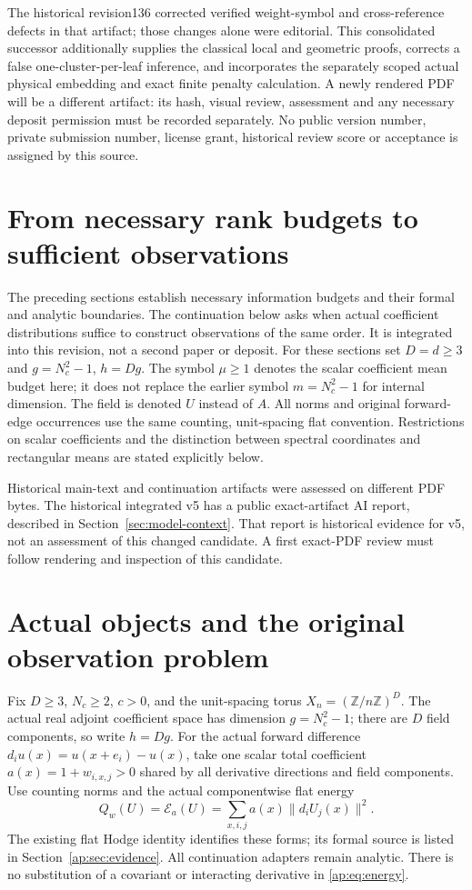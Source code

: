 \documentclass[11pt]{article}
\newcommand{\E}{\mathcal E}
\begin{document}
The historical revision136 corrected verified weight-symbol and cross-reference
defects in that artifact; those changes alone were editorial. This consolidated
successor additionally supplies the classical local and geometric proofs,
corrects a false one-cluster-per-leaf inference, and incorporates the separately
scoped actual physical embedding and exact finite penalty calculation. A newly rendered PDF will be a different
artifact: its hash, visual review, assessment and any necessary deposit permission
must be recorded separately. No public version number, private submission number,
license grant, historical review score or acceptance is assigned by this source.

\section{From necessary rank budgets to sufficient observations}
The preceding sections establish necessary information budgets and their
formal and analytic boundaries. The continuation below asks when actual
coefficient distributions suffice to construct observations of the same
order. It is integrated into this revision, not a second paper or deposit.
For these sections set $D=d\geq3$ and $g=N_c^2-1$, $h=Dg$.
The symbol $\mu\geq1$ denotes the scalar coefficient mean budget here;
it does not replace the earlier symbol $m=N_c^2-1$ for internal dimension.
The field is denoted $U$ instead of $A$. All norms and original forward-edge
occurrences use the same counting, unit-spacing flat convention. Restrictions
on scalar coefficients and the distinction between spectral coordinates and
rectangular means are stated explicitly below.

Historical main-text and continuation artifacts were assessed on different
PDF bytes. The historical integrated v5 has a public exact-artifact
AI report, described in Section~\ref{sec:model-context}. That report is historical
evidence for v5, not an assessment of this changed candidate. A first exact-PDF
review must follow rendering and inspection of this candidate.
\section{Actual objects and the original observation problem}\label{ap:sec:objects}
Fix $D\geq3$, $N_c\geq2$, $c>0$, and the unit-spacing torus
$X_n=(\mathbb Z/n\mathbb Z)^D$. The actual real adjoint coefficient space has dimension
$g=N_c^2-1$; there are $D$ field components, so write $h=Dg$.
For the actual forward difference $d_i u(x)=u(x+e_i)-u(x)$, take one scalar total
coefficient $a(x)=1+w_{i,x,j}>0$ shared by all derivative directions and field components.
Use counting norms and the actual componentwise flat energy
\begin{equation}\label{ap:eq:energy}
 Q_w(U)=\E_a(U)=\sum_{x,i,j}a(x)\|d_iU_j(x)\|^2.
\end{equation}
The existing flat Hodge identity identifies these forms; its formal source is listed
in Section~\ref{ap:sec:evidence}. All continuation adapters remain analytic.
There is no substitution of a covariant or interacting derivative in \eqref{ap:eq:energy}.
\end{document}
